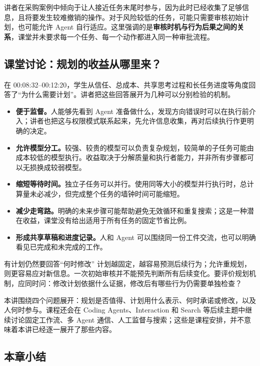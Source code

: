 \documentclass[11pt,a4paper]{article}
\begin{document}
讲者在采购案例中倾向于让人接近任务末尾时参与，因为此时已经收集了足够信息，且将要发生较难撤销的操作。对于风险较低的任务，可能只需要审核初始计划，也可能允许 Agent 自行适应。这里强调的是\textbf{审核时机与行为后果之间的关系}，课堂并未要求每一个任务、每一个动作都进入同一种审批流程。

\subsection{课堂讨论：规划的收益从哪里来？}

在 00:08:32--00:12:20，学生从信任、总成本、共享思考过程和长任务进度等角度回答了“为什么需要计划”。讲者把这些回答展开为几种可以分别检验的机制。

\begin{itemize}
\item \textbf{便于监督。}人能够先看到 Agent 准备做什么，发现方向错误时可以在执行前介入；讲者也把这与权限模式联系起来，先允许信息收集，再对后续执行作更明确的决定。
\item \textbf{允许模型分工。}较强、较贵的模型可以负责复杂规划，较简单的子任务可能由成本较低的模型执行。收益取决于分解质量和执行者能力，并非所有步骤都可以无损换成较弱模型。
\item \textbf{缩短等待时间。}独立子任务可以并行。使用同等大小的模型并行执行时，总计算量未必减少，但完成整个任务的墙钟时间可能缩短。
\item \textbf{减少走弯路。}明确的未来步骤可能帮助避免无效循环和重复搜索；这是一种潜在收益，课堂没有给出适用于所有任务的固定节省比例。
\item \textbf{形成共享草稿和进度记录。}人和 Agent 可以围绕同一份工件交流，也可以明确看见已完成和未完成的工作。
\end{itemize}

\begin{warningbox}{有计划仍然要回答“何时修改”}
计划越固定，越容易预测后续行为；允许重规划，则更容易应对新信息。一次初始审核并不能预先判断所有后续变化。要评价规划机制，应同时问：修改计划依据什么证据，修改后有哪些行为仍需要单独检查？
\end{warningbox}

本讲围绕四个问题展开：规划是否值得、计划用什么表示、何时承诺或修改，以及人何时参与。课程还会在 Coding Agents、Interaction 和 Search 等后续主题中继续讨论固定工作流、多 Agent 通信、人工监督与搜索；这些是课程安排，并不意味着本讲已经逐一展开了那些内容。

\subsection{本章小结}
\end{document}
